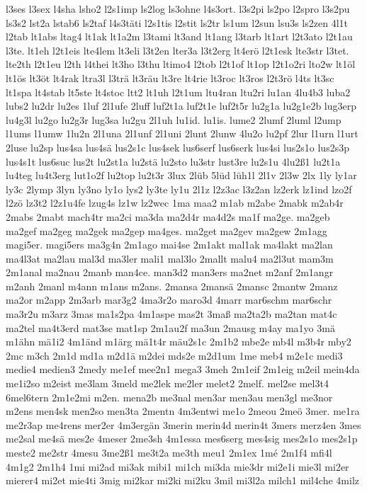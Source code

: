 {l3ses
l3sex
l4sha
lsho2
l2s1imp
ls2log
ls3ohne
l4s3ort.
l3s2pi
ls2po
l2spro
l3s2pu
ls3s2
lst2a
lstab6
ls2taf
l4s3täti
l2s1tis
l2stit
ls2tr
ls1um
l2sun
lsu3s
ls2zen
4l1t
l2tab
lt1abs
ltag4
lt1ak
lt1a2m
l3tami
lt3and
lt1ang
l3tarb
lt1art
l2t3ato
l2t1au
l3te.
lt1eh
l2t1eis
lte4lem
lt3eli
l3t2en
lter3a
l3t2erg
lt4erö
l2t1esk
lte3str
l3tet.
lte2th
l2t1eu
l2th
l4thei
lt3ho
l3thu
ltimo4
l2tob
l2t1of
lt1op
l2t1o2ri
lto2w
lt1öl
lt1ös
lt3öt
lt4rak
ltra3l
l3trä
lt3räu
lt3re
lt4rie
lt3roc
lt3ros
l2t3rö
l4ts
lt3sc
lt1spa
lt4stab
lt5ste
lt4stoc
ltt2
lt1uh
l2t1um
ltu4ran
ltu2ri
lu1an
4lu4b3
luba2
lubs2
lu2dr
lu2es
1luf
2l1ufe
2luff
luf2t1a
luf2t1e
luf2t5r
lu2g1a
lu2g1e2b
lug3erp
lu4g3l
lu2go
lu2g3r
lug3sa
lu2gu
2l1uh
lu1id.
lu1is.
lume2
2lumf
2luml
l2ump
l1ums
l1umw
1lu2n
2l1una
2l1unf
2l1uni
2lunt
2lunw
4lu2o
lu2pf
2lur
l1urn
l1urt
2luse
lu2sp
lus4sa
lus4sä
lus2s1c
lus4sek
lus6serf
lus6serk
lus4si
lus2s1o
lus2s3p
lus4s1t
lus6suc
lus2t
lu2st1a
lu2stä
lu2sto
lu3str
lust3re
lu2s1u
4lu2ß1
lu2t1a
lu4teg
lu4t3erg
lut1o2f
lu2top
lu2t3r
3lux
2lüb
5lüd
lüh1l
2l1v
2l3w
2lx
1ly
ly1ar
ly3c
2lymp
3lyn
ly3no
ly1o
lys2
ly3te
ly1u
2l1z
l2z3ac
l3z2an
lz2erk
lz1ind
lzo2f
l2zö
lz3t2
l2z1u4fe
lzug4s
lz1w
lz2wec
1ma
maa2
m1ab
m2abe
2mabk
m2ab4r
2mabs
2mabt
mach4tr
ma2ci
ma3da
ma2d4r
ma4d2s
ma1f
ma2ge.
ma2geb
ma2gef
ma2geg
ma2gek
ma2gep
ma4ges.
ma2get
ma2gev
ma2gew
2m1agg
magi5er.
magi5ers
ma3g4n
2m1ago
mai4se
2m1akt
mal1ak
ma4lakt
ma2lan
ma4l3at
ma2lau
mal3d
ma3ler
mali1
mal3lo
2mallt
malu4
ma2l3ut
mam3m
2m1anal
ma2nau
2manb
man4ce.
man3d2
man3ers
ma2net
m2anf
2m1angr
m2anh
2manl
m4ann
m1ans
m2ans.
2mansa
2mansä
2mansc
2mantw
2manz
ma2or
m2app
2m3arb
mar3g2
4ma3r2o
maro3d
4marr
mar6schm
mar6schr
ma3r2u
m3arz
3mas
ma1s2pa
4m1aspe
mas2t
3maß
ma2ta2b
ma2tan
mat4c
ma2tel
ma4t3erd
mat3se
mat1sp
2m1au2f
ma3un
2mausg
m4ay
ma1yo
3mä
m1ähn
mä1i2
4m1änd
m1ärg
mä1t4r
mäu2s1c
2m1b2
mbe2e
mb4l
m3b4r
mby2
2mc
m3ch
2m1d
md1a
m2d1ä
m2dei
mds2e
m2d1um
1me
meb4
m2e1c
medi3
medie4
medien3
2medy
me1ef
mee2n1
mega3
3meh
2m1eif
2m1eig
m2eil
mein4da
me1i2so
m2eist
me3lam
3meld
me2lek
me2ler
melet2
2melf.
mel2se
mel3t4
6mel6tern
2m1e2mi
m2en.
mena2b
me3nal
men3ar
men3au
men3gl
me3nor
m2ens
men4sk
men2so
men3ta
2mentn
4m3entwi
me1o
2meou
2meö
3mer.
me1ra
me2r3ap
me4rens
mer2er
4m3ergän
3merin
merin4d
merin4t
3mers
merz4en
3mes
me2sal
me4sä
mes2e
4meser
2me3sh
4m1essa
mes6serg
mes4sig
mes2s1o
mes2s1p
meste2
me2str
4mesu
3me2ß1
me3t2a
me3th
meu1
2m1ex
1mé
2m1f4
mfi4l
4m1g2
2m1h4
1mi
mi2ad
mi3ak
mibi1
mi1ch
mi3da
mie3dr
mi2e1i
mie3l
mi2er
mierer4
mi2et
mie4ti
3mig
mi2kar
mi2ki
mi2ku
3mil
mi3l2a
milch1
mil4che
4milz
}

